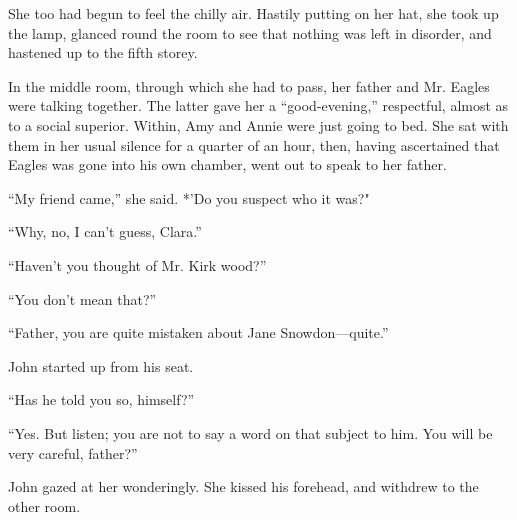 She too had begun to feel the chilly air. Hastily putting on her hat,
she took up the lamp, glanced round the room to see that nothing was
left in disorder, and hastened up to the fifth storey.

In the middle room, through which she had to pass, her father and Mr.
Eagles were talking together. The latter gave her a ``good-evening,''
respectful, almost as to a social {\protect\hypertarget{92}{}{}}
superior. Within, Amy and Annie were just going to bed. She sat with
them in her usual silence for a quarter of an hour, then, having
ascertained that Eagles was gone into his own chamber, went out to speak
to her father.

``My friend came,'' she said. *'Do you suspect who it was?"

``Why, no, I can't guess, Clara.''

``Haven't you thought of Mr. Kirk wood?''

``You don't mean that?''

``Father, you are quite mistaken about Jane Snowdon---quite.''

John started up from his seat.

``Has he told you so, himself?''

``Yes. But listen; you are not to say a word on that subject to him. You
will be very careful, father?''

John gazed at her wonderingly. She kissed his forehead, and withdrew to
the other room.
